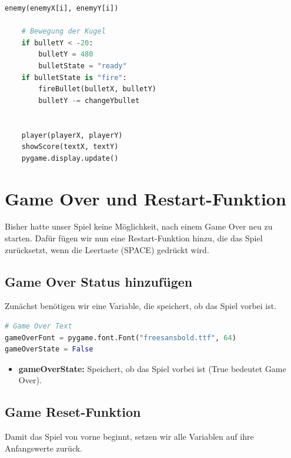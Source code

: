 \documentclass{article}
\begin{document}
\begin{lstlisting}[style=pythonstyle, language=Python]
        enemy(enemyX[i], enemyY[i])

    # Bewegung der Kugel
    if bulletY < -20: 
        bulletY = 480
        bulletState = "ready"
    if bulletState is "fire":
        fireBullet(bulletX, bulletY)
        bulletY -= changeYbullet

        
    player(playerX, playerY)
    showScore(textX, textY)
    pygame.display.update()

\end{lstlisting}

\newpage

\section{Game Over und Restart-Funktion}
Bisher hatte unser Spiel keine Möglichkeit, nach einem Game Over neu zu starten.  
Dafür fügen wir nun eine Restart-Funktion hinzu, die das Spiel zurücksetzt, wenn die Leertaste (SPACE) gedrückt wird.

\subsection{Game Over Status hinzufügen}
Zunächst benötigen wir eine Variable, die speichert, ob das Spiel vorbei ist.

\begin{lstlisting}[style=pythonstyle, language=Python]
# Game Over Text
gameOverFont = pygame.font.Font("freesansbold.ttf", 64)
gameOverState = False
\end{lstlisting}

\begin{itemize}
\item \textbf{gameOverState:} Speichert, ob das Spiel vorbei ist (True bedeutet Game Over).
\end{itemize} 


\subsection{Game Reset-Funktion}
Damit das Spiel von vorne beginnt, setzen wir alle Variablen auf ihre Anfangswerte zurück.
\end{document}
